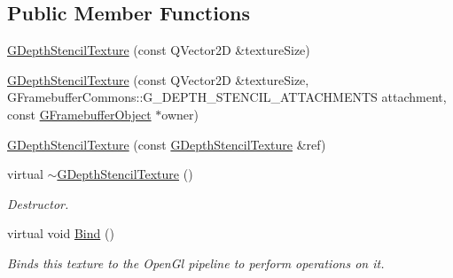 \subsection*{Public Member Functions}
\begin{DoxyCompactItemize}
\item 
\mbox{\hyperlink{class_geometry_engine_1_1_geometry_buffer_1_1_g_depth_stencil_texture_a2b0715430a2189c9fdce17ab836bbf25}{G\+Depth\+Stencil\+Texture}} (const Q\+Vector2D \&texture\+Size)
\item 
\mbox{\hyperlink{class_geometry_engine_1_1_geometry_buffer_1_1_g_depth_stencil_texture_a03bf1c5b969afa4dbf5a7c53b6c9a58a}{G\+Depth\+Stencil\+Texture}} (const Q\+Vector2D \&texture\+Size, G\+Framebuffer\+Commons\+::\+G\+\_\+\+D\+E\+P\+T\+H\+\_\+\+S\+T\+E\+N\+C\+I\+L\+\_\+\+A\+T\+T\+A\+C\+H\+M\+E\+N\+TS attachment, const \mbox{\hyperlink{class_geometry_engine_1_1_geometry_buffer_1_1_g_framebuffer_object}{G\+Framebuffer\+Object}} $\ast$owner)
\item 
\mbox{\hyperlink{class_geometry_engine_1_1_geometry_buffer_1_1_g_depth_stencil_texture_a32fd061895c2acd68316c4135607b25c}{G\+Depth\+Stencil\+Texture}} (const \mbox{\hyperlink{class_geometry_engine_1_1_geometry_buffer_1_1_g_depth_stencil_texture}{G\+Depth\+Stencil\+Texture}} \&ref)
\item 
\mbox{\label{class_geometry_engine_1_1_geometry_buffer_1_1_g_depth_stencil_texture_a5d4d22445a0212fb49d16da101fd5bdf}} 
virtual \mbox{\hyperlink{class_geometry_engine_1_1_geometry_buffer_1_1_g_depth_stencil_texture_a5d4d22445a0212fb49d16da101fd5bdf}{$\sim$\+G\+Depth\+Stencil\+Texture}} ()
\begin{DoxyCompactList}\small\item\em Destructor. \end{DoxyCompactList}\item 
\mbox{\label{class_geometry_engine_1_1_geometry_buffer_1_1_g_depth_stencil_texture_a00941483d89f2eb8f2adb09fb3744801}} 
virtual void \mbox{\hyperlink{class_geometry_engine_1_1_geometry_buffer_1_1_g_depth_stencil_texture_a00941483d89f2eb8f2adb09fb3744801}{Bind}} ()
\begin{DoxyCompactList}\small\item\em Binds this texture to the Open\+Gl pipeline to perform operations on it. \end{DoxyCompactList}\item 

\end{DoxyCompactItemize}
